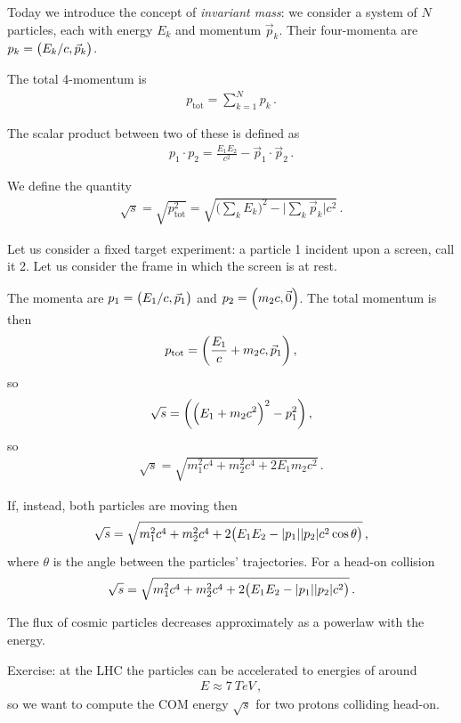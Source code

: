 \documentclass[main.tex]{subfiles}
\begin{document}

Today we introduce the concept of \emph{invariant mass}: we consider a system of \(N\) particles, each with energy \(E_{k}\) and momentum \(\vec{p}_{k}\). 
Their four-momenta are \(p_{k} = \qty(E_{k} / c, \vec{p}_{k})\). 

The total 4-momentum is 
%
\begin{align}
p_{\text{tot}} = \sum_{k=1}^{N} p_{k}
\,.
\end{align}

The scalar product between two of these is defined as 
%
\begin{align}
p_1 \cdot p_{2} = \frac{E_1 E_2 }{c^2} - \vec{p}_{1} \cdot \vec{p}_{2}
\,.
\end{align}

We define the quantity 
%
\begin{align}
\sqrt{s} = \sqrt{p^2 _{\text{tot}}}
= \sqrt{\big(\sum _{k} E_{k}\big)^2 - \big|\sum _{k} \vec{p}_{k}\big| c^2}
\,.
\end{align}

Let us consider a fixed target experiment: a particle 1 incident upon a screen, call it 2. 
Let us consider the frame in which the screen is at rest. 

The momenta are \(p_1 = \qty(E_1 / c,  \vec{p}_{1})\) and \(p_2 = \qty(m_2 c, \vec{0})\). 
The total momentum is then 
%
\begin{align}
p _{\text{tot}} = \qty(\frac{E_1}{c} + m_2 c , \vec{p}_{1})
\,,
\end{align}
%
so 
%
\begin{align}
\sqrt{s} = \qty(\qty(E_1 + m_2 c^2)^2 - p_1^2)
\,,
\end{align}
%
so 
%
\begin{align}
\sqrt{s} = \sqrt{m_1^2c^{4} + m_2^2c^{4} + 2 E_1 m_2 c^2}
\,.
\end{align}

If, instead, both particles are moving then  
%
\begin{align}
\sqrt{s} = \sqrt{m_1^2c^{4} + m_2^2c^{4} + 2 \qty(E_1 E_2 - \abs{p_1 } \abs{p_2 } c^2 \cos \theta )}
\,,
\end{align}
%
where \(\theta \) is the angle between the particles' trajectories. For a head-on collision 
%
\begin{align}
\sqrt{s} = 
\sqrt{m_1^2c^{4} + m_2^2c^{4} + 2 \qty(E_1 E_2 - \abs{p_1 } \abs{p_2 } c^2)}
\,.
\end{align}

The flux of cosmic particles decreases approximately as a powerlaw with the energy. 

Exercise: at the LHC the particles can be accelerated to energies of around
%
\begin{align}
E \approx \SI{7}{TeV}
\,,
\end{align}
%
so we want to compute the COM energy \(\sqrt{s}\) for two protons colliding head-on. 
\end{document}

